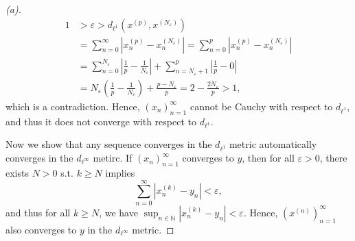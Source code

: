 \begin{proof}[(a)]
  \begin{align*}
    1 &> \varepsilon > d_{\ell ^1} \left( x^{(p)}, x^{(N_{\varepsilon } )} \right) \\
    &= \sum_{n=0}^{\infty} \left\vert x_n^{(p)} - x_n^{(N_{\varepsilon } )} \right\vert = \sum_{n=0}^{p} \left\vert x_n^{(p)} - x_n^{(N_{\varepsilon })} \right\vert \\
    &= \sum_{n=0}^{N_{\varepsilon } } \left\vert \frac{1}{p} - \frac{1}{N_{\varepsilon }} \right\vert + \sum_{n=N_{\varepsilon } + 1}^{p} \left\vert \frac{1}{p} - 0 \right\vert \\
    &= N_{\varepsilon } \left( \frac{1}{p} - \frac{1}{N_{\varepsilon }} \right) + \frac{p - N_{\varepsilon } }{p} = 2 - \frac{2N_{\varepsilon } }{p} > 1,  
  \end{align*}  
  which is a contradiction. Hence, \(\left( x_n \right)_{n=1}^{\infty}  \) cannot be Cauchy with respect to \(d_{\ell ^1}\), and thus it does not converge with respect to \(d_{\ell ^1}\). 
  
  Now we show that any sequence converges in the \(d_{\ell ^1}\) metric automatically converges in the \(d_{\ell ^{\infty} }\) metirc. If \(\left( x_n \right)_{n=1}^{\infty}  \) converges to \(y\), then for all \(\varepsilon > 0\), there exists \(N > 0\) s.t. \(k \ge N\) implies 
  \[
    \sum_{n=0}^{\infty} \left\vert x_n^{(k)} - y_n \right\vert < \varepsilon ,  
  \] and thus for all \(k \ge N\), we have \(\sup _{n \in \mathbb{N} } \left\vert x_n^{(k)} - y_n \right\vert < \varepsilon \). Hence, \(\left( x^{(n)} \right)_{n=1}^{\infty}  \) also converges to \(y\) in the \(d_{\ell ^{\infty} }\) metric.  
\end{proof}
